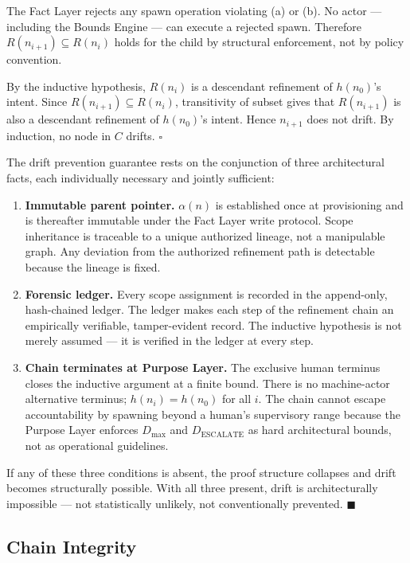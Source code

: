 The Fact Layer rejects any spawn operation violating (a) or (b). No actor — including the Bounds Engine — can execute a rejected spawn. Therefore $R(n_{i+1}) \subseteq R(n_i)$ holds for the child by structural enforcement, not by policy convention.

By the inductive hypothesis, $R(n_i)$ is a descendant refinement of $h(n_0)$'s intent. Since $R(n_{i+1}) \subseteq R(n_i)$, transitivity of subset gives that $R(n_{i+1})$ is also a descendant refinement of $h(n_0)$'s intent. Hence $n_{i+1}$ does not drift. By induction, no node in $C$ drifts. $\square$

\medskip
The drift prevention guarantee rests on the conjunction of three architectural facts, each individually necessary and jointly sufficient:

\begin{enumerate}
    \item[(1)] \textbf{Immutable parent pointer.} $\alpha(n)$ is established once at provisioning and is thereafter immutable under the Fact Layer write protocol. Scope inheritance is traceable to a unique authorized lineage, not a manipulable graph. Any deviation from the authorized refinement path is detectable because the lineage is fixed.
    \item[(2)] \textbf{Forensic ledger.} Every scope assignment is recorded in the append-only, hash-chained ledger. The ledger makes each step of the refinement chain an empirically verifiable, tamper-evident record. The inductive hypothesis is not merely assumed — it is verified in the ledger at every step.
    \item[(3)] \textbf{Chain terminates at Purpose Layer.} The exclusive human terminus closes the inductive argument at a finite bound. There is no machine-actor alternative terminus; $h(n_i) = h(n_0)$ for all $i$. The chain cannot escape accountability by spawning beyond a human's supervisory range because the Purpose Layer enforces $D_{\mathrm{max}}$ and $D_{\mathrm{ESCALATE}}$ as hard architectural bounds, not as operational guidelines.
\end{enumerate}

If any of these three conditions is absent, the proof structure collapses and drift becomes structurally possible. With all three present, drift is architecturally impossible — not statistically unlikely, not conventionally prevented. $\blacksquare$

\subsection{Chain Integrity}
\label{sec:rs-chain-integrity}

